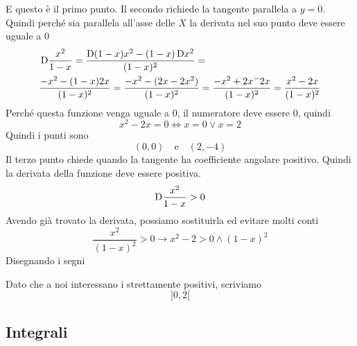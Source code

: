 E questo è il primo punto. Il secondo richiede la tangente parallela a $y=0$. Quindi perché sia
parallela all'asse delle $X$ la derivata nel suo punto deve essere uguale a $0$
\begin{align*}
  &\mathop{}\!\mathrm{D} \frac{x^2}{1-x} = \frac{\mathop{}\!\mathrm{D}(1-x)x^2-(1-x)\mathop{}\!\mathrm{D} x^2}{(1-x)^2}=\\
  &\frac{-x^2-(1-x)2x}{(1-x)^2}=
  \frac{-x^2-(2x-2x^2)}{(1-x)^2} = \frac{-x^2+2x^-2x}{(1-x)^2}=\frac{x^2-2x}{(1-x)^2}
\end{align*}
Perché questa funzione venga uguale a $0$, il numeratore deve essere $0$, quindi
\begin{equation*}
  x^2-2x=0 \Leftrightarrow x=0\lor x=2 
\end{equation*}
Quindi i punti sono
\begin{equation*}
  \boxed{(0,0)\quad\text{e}\quad(2,-4)}
\end{equation*}
Il terzo punto chiede quando la tangente ha coefficiente angolare positivo. Quindi la derivata
della funzione deve essere positiva.
\begin{equation*}
  \mathop{}\!\mathrm{D} \frac{x^2}{1-x}>0
\end{equation*}
Avendo già trovato la derivata, possiamo sostituirla ed evitare molti conti
\begin{equation*}
  \frac{x^2}{(1-x)^2}>0 \rightarrow x^2-2>0\land(1-x)^2
\end{equation*}
Disegnando i segni
\begin{center}
\end{center}
Dato che a noi interessano i strettamente positivi, scriviamo
\begin{equation*}
  \boxed{{]{0},{2}[}}
\end{equation*}

\subsection*{Integrali}

